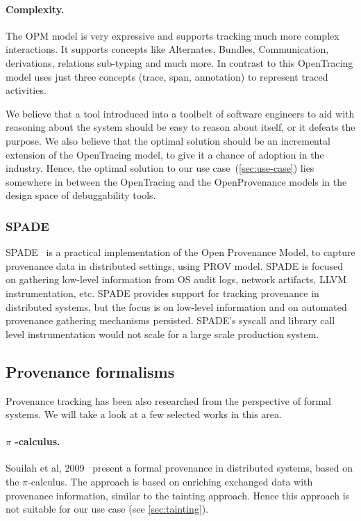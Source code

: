 \paragraph*{Complexity.} The OPM model is very expressive and supports tracking much more complex interactions. It supports concepts like Alternates, Bundles, Communication, derivations, relations sub-typing and much more. In contrast to this OpenTracing model uses just three concepts (trace, span, annotation) to represent traced activities.

\bigskip

We believe that a tool introduced into a toolbelt of software engineers to aid with reasoning about the system should be easy to reason about itself, or it defeats the purpose. We also believe that the optimal solution should be an incremental extension of the OpenTracing model, to give it a chance of adoption in the industry. Hence, the optimal solution to our use case~(\cref{sec:use-case}) lies somewhere in between the OpenTracing and the OpenProvenance models in the design space of debuggability tools.

\subsubsection{SPADE}%

SPADE~\cite{gehani2012spade} is a practical implementation of the Open Provenance Model, to capture provenance data in distributed settings, using PROV model. SPADE is focused on gathering low-level information from OS audit logs, network artifacts, LLVM instrumentation, etc. SPADE provides support for tracking provenance in distributed systems, but the focus is on low-level information and on automated provenance gathering mechanisms persisted. SPADE’s syscall and library call level instrumentation would not scale for a large scale production system.

\subsection{Provenance formalisms}

Provenance tracking has been also researched from the perspective of formal systems. We will take a look at a few selected works in this area.

\paragraph*{$ \pi $ -calculus.} Souilah et al, 2009~\cite{souilah2009formal} present a formal provenance in distributed systems, based on the $\pi$-calculus. The approach is based on enriching exchanged data with provenance information, similar to the tainting approach. Hence this approach is not suitable for our use case (see \cref{sec:tainting}).

